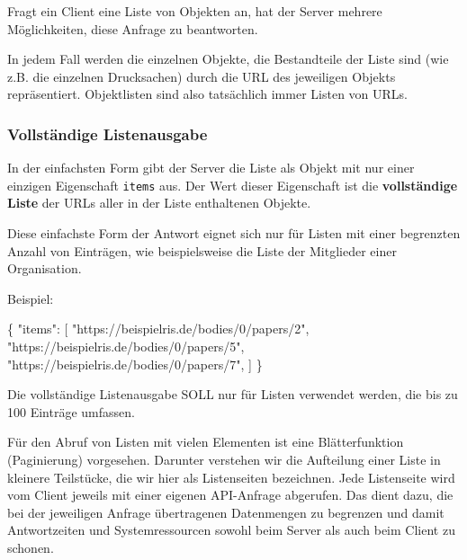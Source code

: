 \documentclass[,a4paper]{article}
\newenvironment{Shaded}{}{}
\newcommand{\DataTypeTok}[1]{\textcolor[rgb]{0.56,0.13,0.00}{{#1}}}
\newcommand{\StringTok}[1]{\textcolor[rgb]{0.25,0.44,0.63}{{#1}}}
\newcommand{\NormalTok}[1]{{#1}}
\begin{document}
Fragt ein Client eine Liste von Objekten an, hat der Server mehrere
Möglichkeiten, diese Anfrage zu beantworten.

In jedem Fall werden die einzelnen Objekte, die Bestandteile der Liste
sind (wie z.B. die einzelnen Drucksachen) durch die URL des jeweiligen
Objekts repräsentiert. Objektlisten sind also tatsächlich immer Listen
von URLs.

\subsubsection{Vollständige
Listenausgabe}\label{vollstuxe4ndige-listenausgabe}

In der einfachsten Form gibt der Server die Liste als Objekt mit nur
einer einzigen Eigenschaft \texttt{items} aus. Der Wert dieser
Eigenschaft ist die \textbf{vollständige Liste} der URLs aller in der
Liste enthaltenen Objekte.

Diese einfachste Form der Antwort eignet sich nur für Listen mit einer
begrenzten Anzahl von Einträgen, wie beispielsweise die Liste der
Mitglieder einer Organisation.

Beispiel:

\begin{Shaded}
\begin{Highlighting}[]
\NormalTok{\{}
    \DataTypeTok{"items"}\NormalTok{: [}
        \StringTok{"https://beispielris.de/bodies/0/papers/2"}\NormalTok{,}
        \StringTok{"https://beispielris.de/bodies/0/papers/5"}\NormalTok{,}
        \StringTok{"https://beispielris.de/bodies/0/papers/7"}\NormalTok{,}
    \NormalTok{]}
\NormalTok{\}}
\end{Highlighting}
\end{Shaded}

Die vollständige Listenausgabe SOLL nur für Listen verwendet werden, die
bis zu 100 Einträge umfassen.


Für den Abruf von Listen mit vielen Elementen ist eine Blätterfunktion
(Paginierung) vorgesehen. Darunter verstehen wir die Aufteilung einer
Liste in kleinere Teilstücke, die wir hier als Listenseiten bezeichnen.
Jede Listenseite wird vom Client jeweils mit einer eigenen API-Anfrage
abgerufen. Das dient dazu, die bei der jeweiligen Anfrage übertragenen
Datenmengen zu begrenzen und damit Antwortzeiten und Systemressourcen
sowohl beim Server als auch beim Client zu schonen.
\end{document}
